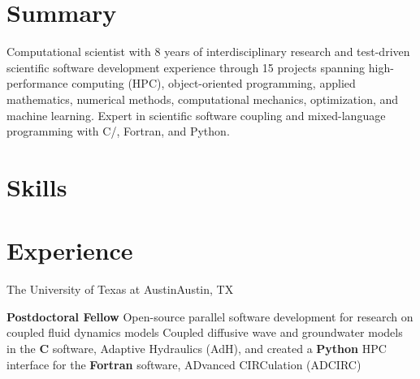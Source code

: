 \documentclass[letterpaper,10pt]{article}
\begin{document}
\section{Summary}
\vspace{-2pt}
Computational scientist with 8 years of interdisciplinary research and
test-driven scientific software development experience through 15\smallplus{}
projects spanning high-performance computing (HPC), object-oriented programming,
applied mathematics, numerical methods, computational mechanics, optimization,
and machine learning. Expert in scientific software coupling and mixed-language
programming with C/\CC{}, Fortran, and Python.

\section{Skills}
  \resumeSubItemListStart
  \resumeSubItemListEnd

\section{Experience}
  \resumeSubHeadingListStart

    \resumeSubheading
      {The University of Texas at Austin}{Austin, TX}

      \resumeSubSubheading
        {\textbf{Postdoctoral Fellow}}{}
        \resumeItemListStart
            {Open-source parallel software development for research on coupled
            fluid dynamics models}
            {Coupled diffusive wave and groundwater models in the \textbf{C}
            software, Adaptive Hydraulics (AdH), and created a \textbf{Python}
            HPC interface for the \textbf{Fortran} software, ADvanced
            CIRCulation (ADCIRC)}
        \resumeItemListEnd
\end{document}
